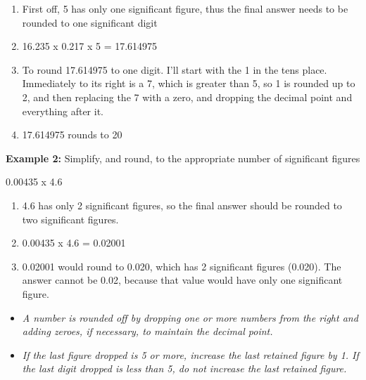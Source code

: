 \begin{itemize}
\begin{itemize}
\begin{center}
\end{center}
\begin{enumerate}[Step 1.]
\item First off, 5 has only one significant figure, thus the final answer needs to be rounded to one significant digit\\
\item 16.235 x 0.217 x 5 = 17.614975\\
\item To round 17.614975 to one digit. I'll start with the 1 in the tens place. Immediately to its right is a 7, which is greater than 5, so 1 is rounded up to 2, and then replacing the 7 with a zero, and dropping the decimal point and everything after it.
\item 17.614975 rounds to 20\\
\end{enumerate}
\textbf{Example 2:}  Simplify, and round, to the appropriate number of significant figures\\
\begin{center}
0.00435 x 4.6
\end{center}
\begin{enumerate}[Step 1.]
\item 4.6 has only 2 significant figures, so the final answer should be rounded to two significant figures.
\item 0.00435 x 4.6 = 0.02001\\
\item 0.02001 would round to 0.020, which has 2 significant figures (0.020). The answer cannot be 0.02, because that value would have only one significant figure.\\
\end{enumerate}
\end{itemize}
\end{itemize}

\begin{itemize}
\item \emph{A number is rounded off by dropping one or more numbers from the right and adding zeroes, if necessary, to maintain the decimal point.} 
\item \emph{If the last figure dropped is 5 or more, increase the last retained figure by 1. If the last digit dropped is less than 5, do not increase the last retained figure.}
\end{itemize}


